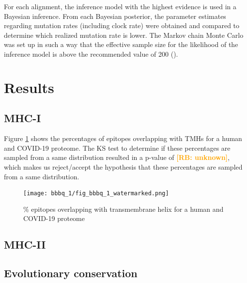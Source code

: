 \documentclass{article}
\newcommand{\richel}[1]{\textcolor{orange}{\textbf{[RB: #1]}}}
\begin{document}
	For each alignment, the inference model with the highest evidence
	is used in a Bayesian inference. From each Bayesian posterior,
	the parameter estimates regarding mutation rates (including clock rate)
	were obtained and compared to determine which realized mutation rate is lower.
	The Markov chain Monte Carlo was set up in such a way that the effective sample
	size for the likelihood of the inference model is above the recommended value
	of 200 (\cite{bouckaert2014beast}).
\fi

\section{Results}

\subsection{MHC-I}

Figure \ref{fig:1} shows the percentages of epitopes overlapping 
with TMHs for a human and COVID-19 proteome.
The KS test to determine if these percentages are sampled from
a same distribution resulted in a p-value of \richel{unknown},
which makes us reject/accept the hypothesis that these percentages
are sampled from a same distribution. 

\begin{figure}[!htbp]
  \texttt{[image: bbbq\_1/fig\_bbbq\_1\_watermarked.png]}
  \caption{
    \% epitopes overlapping with transmembrane helix
    for a human and COVID-19 proteome
  }
  \label{fig:1}
\end{figure}



\subsection{MHC-II}

\subsection{Evolutionary conservation}
\end{document}
